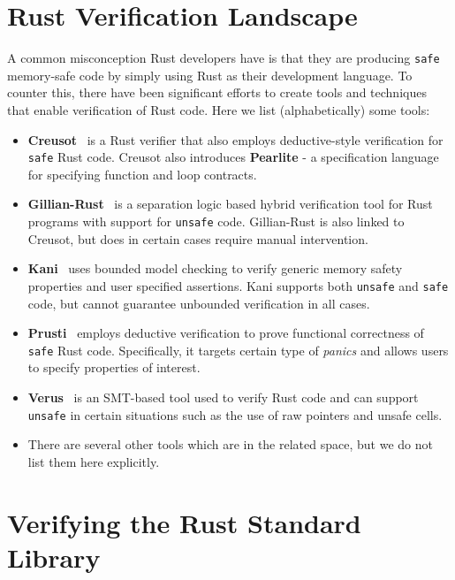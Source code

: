 \documentclass[runningheads]{llncs}
\begin{document}
\section{Rust Verification Landscape}

A common misconception Rust developers have is that they are producing \texttt{safe} memory-safe code by simply using Rust as their development language. To counter this, there have been significant efforts to create tools and techniques that enable verification of Rust code. Here we list (alphabetically) some tools:

\begin{itemize}

    \item \textbf{Creusot}~\cite{denis2022creusot} is a Rust verifier that also employs deductive-style verification for \texttt{safe} Rust code. Creusot also introduces \textbf{Pearlite} - a specification language for specifying function and loop contracts. 

    \item \textbf{Gillian-Rust}~\cite{ayoun2024hybrid} is a separation logic based hybrid verification tool for Rust programs with support for \texttt{unsafe} code. Gillian-Rust is also linked to Creusot, but does in certain cases require manual intervention. 

    \item \textbf{Kani}~\cite{vanhattum2022verifying} uses bounded model checking to verify generic memory safety properties and user specified assertions. Kani supports both \texttt{unsafe} and \texttt{safe} code, but cannot guarantee unbounded verification in all cases. 
 
    \item \textbf{Prusti}~\cite{astrauskas2022prusti} employs deductive verification to prove functional correctness of \texttt{safe} Rust code. Specifically, it targets certain type of \textit{panics} and allows users to specify properties of interest. 

    \item \textbf{Verus}~\cite{verus-sys} is an SMT-based tool used to verify Rust code and can support \texttt{unsafe} in certain situations such as the use of raw pointers and unsafe cells. 

    \item There are several other tools which are in the related space, but we do not list them here explicitly.
\end{itemize}

\section{Verifying the Rust Standard Library}
\end{document}

